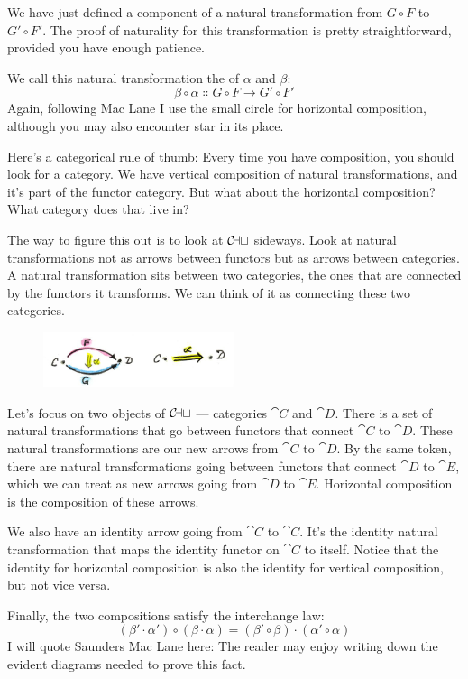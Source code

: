 We have just defined a component of a natural transformation from $G \circ F$
to $G' \circ F'$. The proof of naturality for this transformation is pretty
straightforward, provided you have enough patience.

We call this natural transformation the  of
$\alpha$ and $\beta$:
\[\beta \circ \alpha \Colon G \circ F \to G' \circ F'\]
Again, following Mac Lane I use the small circle for horizontal
composition, although you may also encounter star in its place.

Here's a categorical rule of thumb: Every time you have composition, you
should look for a category. We have vertical composition of natural
transformations, and it's part of the functor category. But what about
the horizontal composition? What category does that live in?

The way to figure this out is to look at $\mathcal{C\mkern-3mu at}$ sideways. Look at
natural transformations not as arrows between functors but as arrows
between categories. A natural transformation sits between two
categories, the ones that are connected by the functors it transforms.
We can think of it as connecting these two categories.

\begin{figure}[H]
\centering
\includegraphics[width=0.5\textwidth]{images/sideways.jpg}
\end{figure}

\noindent
Let's focus on two objects of $\mathcal{C\mkern-3mu at}$ --- categories $\cat{C}$ and $\cat{D}$. There
is a set of natural transformations that go between functors that
connect $\cat{C}$ to $\cat{D}$. These natural transformations are our new arrows from $\cat{C}$
to $\cat{D}$. By the same token, there are natural transformations going between
functors that connect $\cat{D}$ to $\cat{E}$, which we can treat as new arrows going
from $\cat{D}$ to $\cat{E}$. Horizontal composition is the composition of these arrows.

We also have an identity arrow going from $\cat{C}$ to $\cat{C}$. It's the identity
natural transformation that maps the identity functor on $\cat{C}$ to itself.
Notice that the identity for horizontal composition is also the identity
for vertical composition, but not vice versa.

Finally, the two compositions satisfy the interchange law:
\[(\beta' \cdot \alpha') \circ (\beta \cdot \alpha) = (\beta' \circ \beta) \cdot (\alpha' \circ \alpha)\]
I will quote Saunders Mac Lane here: The reader may enjoy writing down
the evident diagrams needed to prove this fact.

